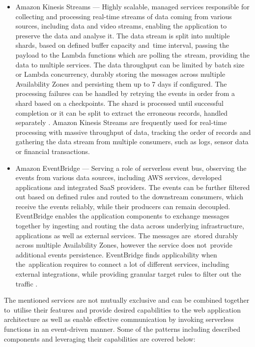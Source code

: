 \begin{itemize}
   \item Amazon Kinesis Streams ---
   Highly scalable, managed services responsible for collecting and processing real-time streams of data coming from various sources, including data and video streams, enabling the application to preserve the data and analyse it.
   The data stream is split into multiple shards, based on defined buffer capacity and~time interval, passing the payload to the Lambda functions which are polling the~stream, providing the data to multiple services.
   The data throughput can be limited by batch size or Lambda concurrency, durably storing the messages across multiple Availability Zones and persisting them up to 7 days if configured.
   The processing failures can be handled by retrying the events in order from a shard based on a checkpoints.
   The shard is processed until successful completion or it can be split to extract the erroneous records, handled separately \cite{ChoosingEventsQueuesTopicsAndStreamsInYourServerlessApplication}.
   Amazon Kinesis Streams are frequently used for real-time processing with massive throughput of data, tracking the order of records and gathering the data stream from multiple consumers, such as logs, sensor data or financial transactions.
  
   \item Amazon EventBridge ---
   Serving a role of serverless event bus, observing the events from various data sources, including AWS services, developed applications and integrated SaaS providers. The events can be further filtered out based on defined rules and routed to the downstream consumers, which receive the events reliably, while their producers can remain decoupled.
   EventBridge enables the application components to exchange messages together by ingesting and routing the data across underlying infrastructure, applications as well as external services.
   The messages are~stored durably across multiple Availability Zones, however the service does not~provide additional events persistence.
   EventBridge finds applicability when the~application requires to connect a lot of different services, including external integrations, while providing granular target rules to filter out the traffic \cite{ChoosingEventsQueuesTopicsAndStreamsInYourServerlessApplication}.
\end{itemize}

The mentioned services are not mutually exclusive and can be combined together to~utilise their features and provide desired capabilities to the web application architecture as well as enable effective communication by invoking serverless functions in an event-driven manner.
Some of the patterns including described components and leveraging their capabilities are covered below:

